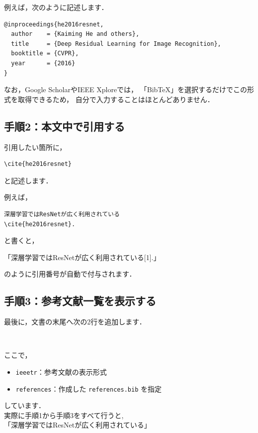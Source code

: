 \documentclass[a4paper,twocolumn]{jsarticle}
\begin{document}
例えば，次のように記述します．

\begin{verbatim}
@inproceedings{he2016resnet,
  author    = {Kaiming He and others},
  title     = {Deep Residual Learning for Image Recognition},
  booktitle = {CVPR},
  year      = {2016}
}
\end{verbatim}

なお，Google ScholarやIEEE Xploreでは，
「BibTeX」を選択するだけでこの形式を取得できるため，
自分で入力することはほとんどありません．

\subsection*{手順2：本文中で引用する}

引用したい箇所に，

\begin{verbatim}
\cite{he2016resnet}
\end{verbatim}

と記述します．

例えば，

\begin{verbatim}
深層学習ではResNetが広く利用されている
\cite{he2016resnet}.
\end{verbatim}

と書くと，

「深層学習ではResNetが広く利用されている[1].」

のように引用番号が自動で付与されます．

\subsection*{手順3：参考文献一覧を表示する}

最後に，文書の末尾へ次の2行を追加します．

\begin{verbatim}


\end{verbatim}

ここで，

\begin{itemize}
    \item \texttt{ieeetr}：参考文献の表示形式
    \item \texttt{references}：作成した \texttt{references.bib} を指定
\end{itemize}

しています．\\
実際に手順1から手順3をすべて行うと,\\
「深層学習ではResNetが広く利用されている\cite{he2016resnet}」
 

\end{document}
